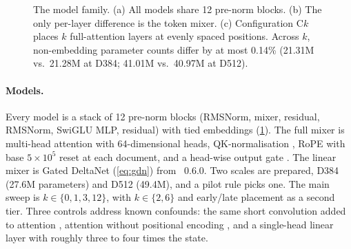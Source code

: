 \documentclass[10pt,a4paper]{article}
\begin{document}
\begin{figure}[t]
\caption{The model family. (a) All models share 12 pre-norm blocks. (b) The only per-layer difference is the
token mixer. (c) Configuration C$k$ places $k$ full-attention layers at evenly spaced positions. Across
$k$, non-embedding parameter counts differ by at most 0.14\% (21.31M vs.\ 21.28M at D384; 41.01M vs.\ 40.97M at D512).}
\label{fig:arch}
\end{figure}

\paragraph{Models.} Every model is a stack of 12 pre-norm blocks (RMSNorm, mixer, residual, RMSNorm,
SwiGLU MLP, residual) with tied embeddings (\cref{fig:arch}). The full mixer is multi-head attention
with 64-dimensional heads, QK-normalisation \citep{henry2020qknorm}, RoPE with base $5\times10^5$
\citep{su2024roformer,dubey2024llama3} reset at each document, and a head-wise output gate
\citep{qiu2025gated}. The linear mixer is Gated DeltaNet (\cref{eq:gdn}) from ~0.6.0. Two
scales are prepared, D384 (27.6M parameters) and D512 (49.4M), and a pilot rule picks one. The main sweep is
$k\in\{0,1,3,12\}$, with $k\in\{2,6\}$ and early/late placement as a second tier. Three controls
address known confounds: the same short convolution added to attention \citep{olsson2022induction},
attention without positional encoding \citep{kazemnejad2023nope}, and a single-head linear layer with roughly three to four times the state.
\end{document}
